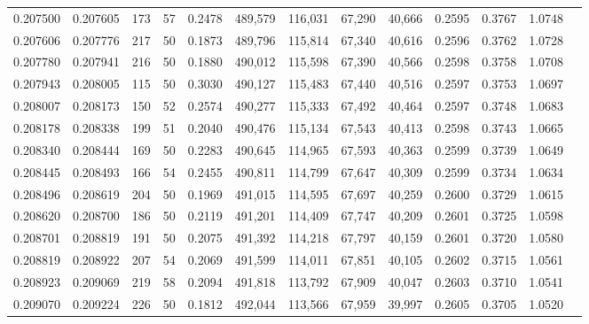 \begin{tabular}{rrrrrrrrrrrrr}
0.207500 & 0.207605 &   173 &  57 &                                     0.2478 & 489,579 & 116,031 &  67,290 &  40,666 & 0.2595 & 0.3767 & 1.0748 \\
0.207606 & 0.207776 &   217 &  50 &                                     0.1873 & 489,796 & 115,814 &  67,340 &  40,616 & 0.2596 & 0.3762 & 1.0728 \\
0.207780 & 0.207941 &   216 &  50 &                                     0.1880 & 490,012 & 115,598 &  67,390 &  40,566 & 0.2598 & 0.3758 & 1.0708 \\
0.207943 & 0.208005 &   115 &  50 &                                     0.3030 & 490,127 & 115,483 &  67,440 &  40,516 & 0.2597 & 0.3753 & 1.0697 \\
0.208007 & 0.208173 &   150 &  52 &                                     0.2574 & 490,277 & 115,333 &  67,492 &  40,464 & 0.2597 & 0.3748 & 1.0683 \\
0.208178 & 0.208338 &   199 &  51 &                                     0.2040 & 490,476 & 115,134 &  67,543 &  40,413 & 0.2598 & 0.3743 & 1.0665 \\
0.208340 & 0.208444 &   169 &  50 &                                     0.2283 & 490,645 & 114,965 &  67,593 &  40,363 & 0.2599 & 0.3739 & 1.0649 \\
0.208445 & 0.208493 &   166 &  54 &                                     0.2455 & 490,811 & 114,799 &  67,647 &  40,309 & 0.2599 & 0.3734 & 1.0634 \\
0.208496 & 0.208619 &   204 &  50 &                                     0.1969 & 491,015 & 114,595 &  67,697 &  40,259 & 0.2600 & 0.3729 & 1.0615 \\
0.208620 & 0.208700 &   186 &  50 &                                     0.2119 & 491,201 & 114,409 &  67,747 &  40,209 & 0.2601 & 0.3725 & 1.0598 \\
0.208701 & 0.208819 &   191 &  50 &                                     0.2075 & 491,392 & 114,218 &  67,797 &  40,159 & 0.2601 & 0.3720 & 1.0580 \\
0.208819 & 0.208922 &   207 &  54 &                                     0.2069 & 491,599 & 114,011 &  67,851 &  40,105 & 0.2602 & 0.3715 & 1.0561 \\
0.208923 & 0.209069 &   219 &  58 &                                     0.2094 & 491,818 & 113,792 &  67,909 &  40,047 & 0.2603 & 0.3710 & 1.0541 \\
0.209070 & 0.209224 &   226 &  50 &                                     0.1812 & 492,044 & 113,566 &  67,959 &  39,997 & 0.2605 & 0.3705 & 1.0520 \\

\end{tabular}
